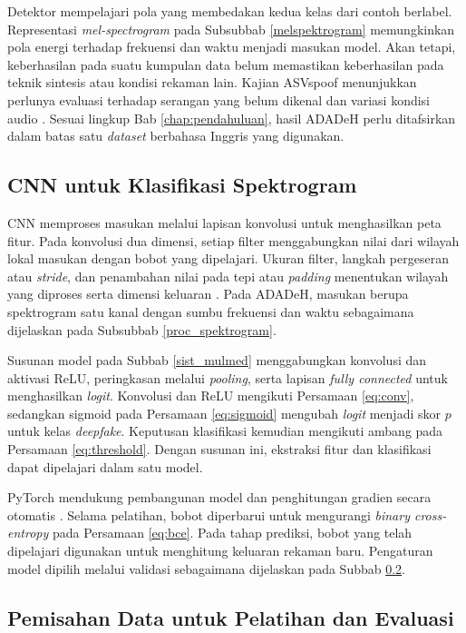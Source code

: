 Detektor mempelajari pola yang membedakan kedua kelas dari contoh berlabel. Representasi \textit{mel-spectrogram} pada Subsubbab \ref{melspektrogram} memungkinkan pola energi terhadap frekuensi dan waktu menjadi masukan model. Akan tetapi, keberhasilan pada suatu kumpulan data belum memastikan keberhasilan pada teknik sintesis atau kondisi rekaman lain. Kajian ASVspoof menunjukkan perlunya evaluasi terhadap serangan yang belum dikenal dan variasi kondisi audio \autocite{wang2019asvspoof}. Sesuai lingkup Bab \ref{chap:pendahuluan}, hasil ADADeH perlu ditafsirkan dalam batas satu \textit{dataset} berbahasa Inggris yang digunakan.

\subsection{CNN untuk Klasifikasi Spektrogram}
\label{cnn}

CNN memproses masukan melalui lapisan konvolusi untuk menghasilkan peta fitur. Pada konvolusi dua dimensi, setiap filter menggabungkan nilai dari wilayah lokal masukan dengan bobot yang dipelajari. Ukuran filter, langkah pergeseran atau \textit{stride}, dan penambahan nilai pada tepi atau \textit{padding} menentukan wilayah yang diproses serta dimensi keluaran \autocite{pytorch2026conv2d}. Pada ADADeH, masukan berupa spektrogram satu kanal dengan sumbu frekuensi dan waktu sebagaimana dijelaskan pada Subsubbab \ref{proc_spektrogram}.

Susunan model pada Subbab \ref{sist_mulmed} menggabungkan konvolusi dan aktivasi ReLU, peringkasan melalui \textit{pooling}, serta lapisan \textit{fully connected} untuk menghasilkan \textit{logit}. Konvolusi dan ReLU mengikuti Persamaan \ref{eq:conv}, sedangkan sigmoid pada Persamaan \ref{eq:sigmoid} mengubah \textit{logit} menjadi skor $p$ untuk kelas \textit{deepfake}. Keputusan klasifikasi kemudian mengikuti ambang pada Persamaan \ref{eq:threshold}. Dengan susunan ini, ekstraksi fitur dan klasifikasi dapat dipelajari dalam satu model.

PyTorch mendukung pembangunan model dan penghitungan gradien secara otomatis \autocite{paszke2019pytorch}. Selama pelatihan, bobot diperbarui untuk mengurangi \textit{binary cross-entropy} pada Persamaan \ref{eq:bce}. Pada tahap prediksi, bobot yang telah dipelajari digunakan untuk menghitung keluaran rekaman baru. Pengaturan model dipilih melalui validasi sebagaimana dijelaskan pada Subbab \ref{pemisahan_data}.

\subsection{Pemisahan Data untuk Pelatihan dan Evaluasi}
\label{pemisahan_data}

